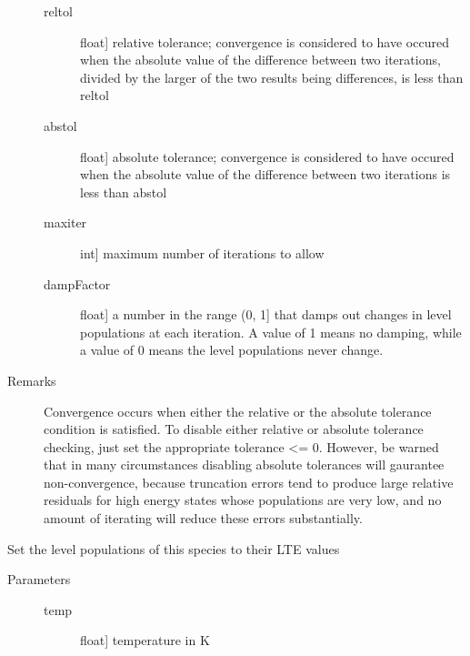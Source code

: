 \documentclass[letterpaper,10pt,english]{sphinxmanual}
\begin{document}
\begin{fulllineitems}
\begin{fulllineitems}
\begin{description}
\begin{description}
\item[{reltol}] \leavevmode{[}float{]}
relative tolerance; convergence is considered to have
occured when the absolute value of the difference
between two iterations, divided by the larger of the two
results being differences, is less than reltol

\item[{abstol}] \leavevmode{[}float{]}
absolute tolerance; convergence is considered to have
occured when the absolute value of the difference
between two iterations is less than abstol

\item[{maxiter}] \leavevmode{[}int{]}
maximum number of iterations to allow

\item[{dampFactor}] \leavevmode{[}float{]}
a number in the range (0, 1{]} that damps out changes in level
populations at each iteration. A value of 1 means no
damping, while a value of 0 means the level populations
never change.

\end{description}

\item[{Remarks}] \leavevmode
Convergence occurs when either the relative or the absolute
tolerance condition is satisfied. To disable either relative
or absolute tolerance checking, just set the appropriate
tolerance \textless{}= 0. However, be warned that in many circumstances
disabling absolute tolerances will gaurantee non-convergence,
because truncation errors tend to produce large relative
residuals for high energy states whose populations are very
low, and no amount of iterating will reduce these errors
substantially.

\end{description}

\end{fulllineitems}


\begin{fulllineitems}
\label{fulldoc:despotic.emitter.setLevPopLTE}
Set the level populations of this species to their LTE values
\begin{description}
\item[{Parameters}] \leavevmode\begin{description}
\item[{temp}] \leavevmode{[}float{]}
temperature in K


\end{description}
\end{description}
\end{fulllineitems}
\end{fulllineitems}
\end{document}
